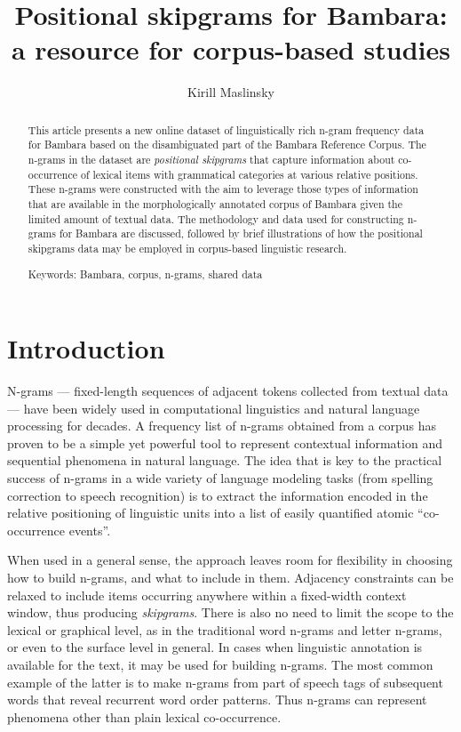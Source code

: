 \documentclass[12pt]{article}
\author{Kirill Maslinsky}
\title{Positional skipgrams for Bambara: a resource for corpus-based studies}
\begin{document}
\maketitle

\begin{abstract}
  This article presents a new online dataset of linguistically rich
  n-gram frequency data for Bambara based on the disambiguated part of
  the Bambara Reference Corpus. The n-grams in the dataset are
  \textit{positional skipgrams} that capture information about
  co-occurrence of lexical items with grammatical categories at
  various relative positions. These n-grams were constructed with the
  aim to leverage those types of information that are available in the
  morphologically annotated corpus of Bambara given the limited amount
  of textual data. The methodology and data used for constructing
  n-grams for Bambara are discussed, followed by brief illustrations
  of how the positional skipgrams data may be employed in corpus-based
  linguistic research.

  Keywords: Bambara, corpus, n-grams, shared data
\end{abstract}

\section{Introduction}

N-grams — fixed-length sequences of adjacent tokens collected from
textual data — have been widely used in computational linguistics and
natural language processing for decades. A frequency list of n-grams
obtained from a corpus has proven to be a simple yet powerful tool to
represent contextual information and sequential phenomena in natural
language.  The idea that is key to the practical success of n-grams in
a wide variety of language modeling tasks (from spelling correction to
speech recognition) is to extract the information encoded in the relative
positioning of linguistic units into a list of easily quantified
atomic “co-occurrence events”.

When used in a general sense, the approach leaves room for flexibility in
choosing how to build n-grams, and what to include in them. Adjacency
constraints can be relaxed to include items occurring anywhere within
a fixed-width context window, thus producing \textit{skipgrams}. There
is also no need to limit the scope to the lexical or graphical level,
as in the traditional word n-grams and letter n-grams, or even to the
surface level in general. In cases when linguistic annotation is
available for the text, it may be used for building n-grams. The most
common example of the latter is to make n-grams from part of speech
tags of subsequent words that reveal recurrent word order patterns.
Thus n-grams can represent phenomena other than plain lexical
co-occurrence.
\end{document}
